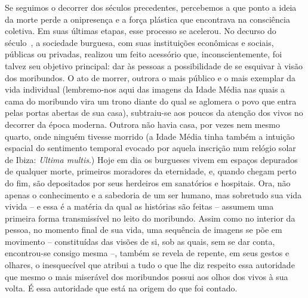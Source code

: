 Se seguimos o decorrer dos séculos precedentes, percebemos a que ponto a
ideia da morte perde a onipresença e a força plástica que encontrava na
consciência coletiva. Em suas últimas etapas, esse processo se acelerou.
No decurso do século~, a sociedade burguesa, com suas instituições
econômicas e sociais, públicas ou privadas, realizou um feito acessório
que, inconscientemente, foi talvez seu objetivo principal: dar às
pessoas a possibilidade de se esquivar à visão dos moribundos. O ato de
morrer, outrora o mais público e o mais exemplar da vida individual
(lembremo-nos aqui das imagens da Idade Média nas quais a cama do
moribundo vira um trono diante do qual se aglomera o povo que entra
pelas portas abertas de sua casa), subtraiu-se aos poucos da atenção dos
vivos no decorrer da época moderna. Outrora não havia casa, por vezes
nem mesmo quarto, onde ninguém tivesse morrido (a Idade Média tinha
também a intuição espacial do sentimento temporal evocado por aquela
inscrição num relógio solar de Ibiza: \emph{Ultima multis}.) Hoje em dia
os burgueses vivem em espaços depurados de qualquer morte, primeiros
moradores da eternidade, e, quando chegam perto do fim, são depositados
por seus herdeiros em sanatórios e hospitais. Ora, não apenas o
conhecimento e a sabedoria de um ser humano, mas sobretudo sua vida
vivida -- e essa é a matéria da qual as histórias são feitas -- assumem
uma primeira forma transmissível no leito do moribundo. Assim como no
interior da pessoa, no momento final de sua vida, uma sequência de
imagens se põe em movimento -- constituídas das visões de si, sob as
quais, sem se dar conta, encontrou-se consigo mesma --, também se revela
de repente, em seus gestos e olhares, o inesquecível que atribui a tudo
o que lhe diz respeito essa autoridade que mesmo o mais miserável dos
moribundos possui aos olhos dos vivos à sua volta. É essa autoridade que
está na origem do que foi contado.

\section{}

